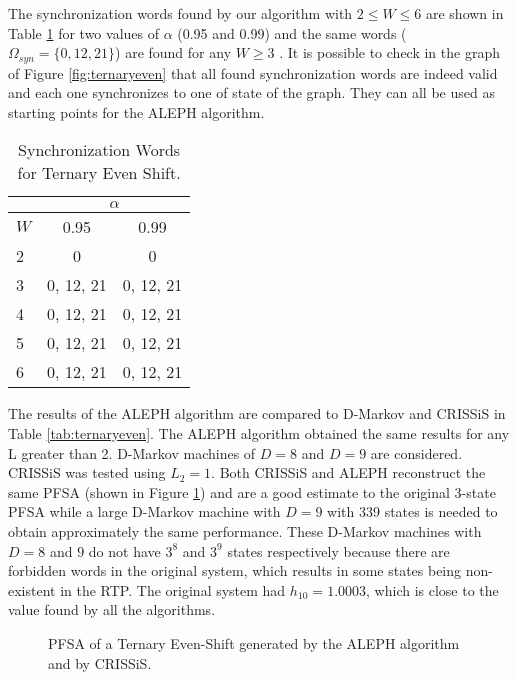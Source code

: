 {The synchronization words found by our algorithm with $2 \leq W \leq 6$ are shown in Table \ref{tab:ternaryevensynch} for two values of $\alpha$ (0.95 and 0.99) and the same words ($\Omega_{syn} = \{0, 12, 21\}$) are found for any $W \geq 3$ . It is possible to check in the graph of Figure \ref{fig:ternaryeven} that all found synchronization words are indeed valid and each one synchronizes to one of state of the graph. They can all be used as starting points for the ALEPH algorithm.

\begin{table}
\centering
\caption{Synchronization Words for Ternary Even Shift. \label{tab:ternaryevensynch}}
\begin{tabular}{|l|c|c|}
\hline
 & \multicolumn{2}{c|}{$\alpha$}\\
 \hline
$W$ & 0.95 & 0.99 \\
\hline
2 & 0 & 0 \\ 
3 & 0, 12, 21 & 0, 12, 21 \\ 
4 & 0, 12, 21 & 0, 12, 21 \\ 
5 & 0, 12, 21 & 0, 12, 21 \\
6 & 0, 12, 21 & 0, 12, 21 \\
 \hline
\end{tabular}
\end{table}

The results of the ALEPH algorithm are compared to D-Markov and CRISSiS in Table \ref{tab:ternaryeven}. The ALEPH algorithm obtained the same results for any L greater than 2. D-Markov machines of $D = 8$ and $D = 9$ are considered. CRISSiS was tested using $L_2 = 1$. Both CRISSiS and ALEPH reconstruct the same PFSA (shown in Figure \ref{fig:ternaryevengen}) and are a good estimate to the original 3-state PFSA  while a large D-Markov machine with $D=9$ with 339 states is needed to obtain approximately the same performance. These D-Markov machines with $D=8$ and $9$ do not have $3^{8}$ and $3^{9}$ states respectively because there are forbidden words in the original system, which results in some states being non-existent in the RTP. The original system had $h_{10} = 1.0003$, which is close to the value found by all the algorithms.

\begin{figure}
\centering
{}
\caption{PFSA of a Ternary Even-Shift generated by the ALEPH algorithm and by CRISSiS.\label{fig:ternaryevengen}}
\end{figure}

}
